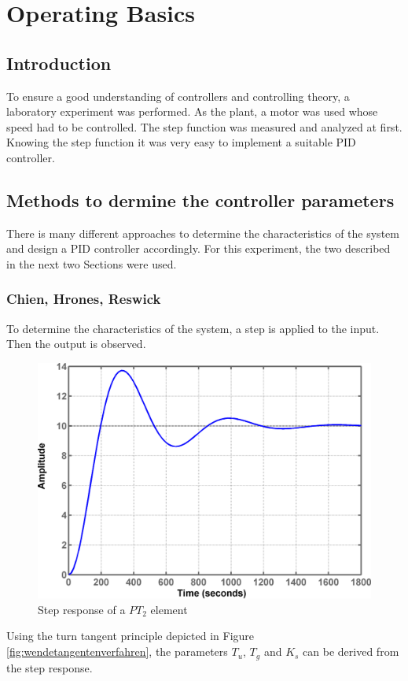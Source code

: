 \section{Operating Basics}

\subsection{Introduction}

To ensure a good understanding of controllers and controlling theory, a laboratory experiment was performed. As the plant, a motor was used whose speed had to be controlled.
The step function was measured and analyzed at first. Knowing the step function it was very easy to implement a suitable PID controller.

\subsection{Methods to dermine the controller parameters}

There is many different approaches to determine the characteristics of the system and design a PID controller accordingly. For this experiment, the two described in the next two Sections were used.

\subsubsection{Chien, Hrones, Reswick}
\label{subs:Chien, Hrones, Reswick}

To determine the characteristics of the system, a step is applied to the input. Then the output is observed.

\begin{figure}[H]
\begin{center}
\includegraphics[width=0.5\linewidth]{images/general/step_pt2}
\end{center}
\caption{Step response of a $PT_2$ element}
\label{fig:step_pt2}
\end{figure}

Using the turn tangent principle depicted in Figure \ref{fig:wendetangentenverfahren}, the parameters $T_u$, $T_g$ and $K_s$ can be derived from the step response.

